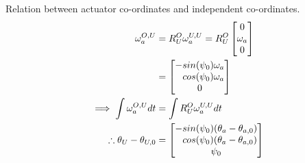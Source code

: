 Relation between actuator co-ordinates and independent co-ordinates.
\begin{equation}
\begin{aligned}
\omega^{O,U}_a&=R^O_U \omega^{U,U}_a
=    R^O_U
\begin{bmatrix}
0 \\ \omega_a \\0
\end{bmatrix}\\
&=\begin{bmatrix}
-sin(\psi_0)\omega_a  \\ \hphantom{-} cos(\psi_0)\omega_a   \\0 %
\end{bmatrix} \\
%
\implies \int \omega^{O,U}_a dt&=\int R^O_U \omega^{U,U}_a dt \\
\therefore \theta_U-\theta_{U,0} &= 
\begin{bmatrix} 
-sin(\psi_0)(\theta_a-\theta_{a,0}) \\ \hphantom{-} cos(\psi_0)(\theta_a-\theta_{a,0}) \\ \psi_0
\end{bmatrix}
\end{aligned}
\end{equation}


